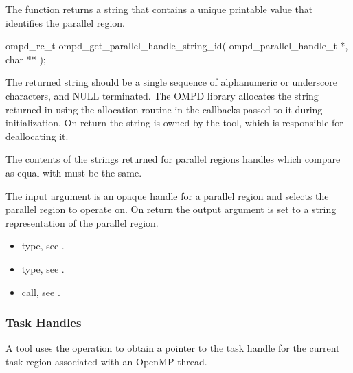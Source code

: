 \label{subsubsubsec:ompd_get_parallel_handle_string_id}
\summary
The  function returns a string that contains a unique
printable value that identifies the parallel region.

\format

\begin{cspecific}
\begin{ompSyntax}
ompd_rc_t ompd_get_parallel_handle_string_id(
  ompd_parallel_handle_t *,
  char **
);
\end{ompSyntax}
\end{cspecific}


\descr
The returned string should be a single sequence of alphanumeric or underscore characters, and
NULL terminated. The OMPD library allocates the string returned in 
using the allocation routine in the callbacks passed to it during initialization. On return the string is
owned by the tool, which is responsible for deallocating it.

The contents of the strings returned for parallel regions handles which compare as equal with
 must be the same.

\argdesc
The input argument  is an opaque handle for a parallel region and selects the parallel region to operate on.
On return the output argument  is set to a string representation of the parallel region.

\crossreferences
\begin{itemize}
  \item {} type, see .
	\item {} type, see .
	\item {} call, see .
\end{itemize}

\subsubsection{Task Handles}

\label{subsubsubsec:ompd_get_current_task_handle}
\summary
A tool uses the  operation to obtain a pointer to the
task handle for the current task region associated with an OpenMP thread.

